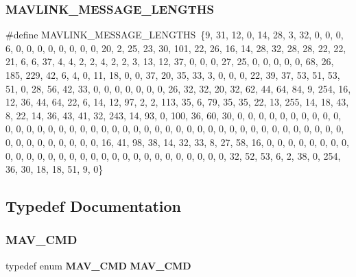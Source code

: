 \mbox{\label{_a_s_l_u_a_v_8h_aa90005429262b658c881fa203c4de208}} 
\subsubsection{M\+A\+V\+L\+I\+N\+K\+\_\+\+M\+E\+S\+S\+A\+G\+E\+\_\+\+L\+E\+N\+G\+T\+HS}
{\footnotesize\ttfamily \#define M\+A\+V\+L\+I\+N\+K\+\_\+\+M\+E\+S\+S\+A\+G\+E\+\_\+\+L\+E\+N\+G\+T\+HS~\{9, 31, 12, 0, 14, 28, 3, 32, 0, 0, 0, 6, 0, 0, 0, 0, 0, 0, 0, 0, 20, 2, 25, 23, 30, 101, 22, 26, 16, 14, 28, 32, 28, 28, 22, 22, 21, 6, 6, 37, 4, 4, 2, 2, 4, 2, 2, 3, 13, 12, 37, 0, 0, 0, 27, 25, 0, 0, 0, 0, 0, 68, 26, 185, 229, 42, 6, 4, 0, 11, 18, 0, 0, 37, 20, 35, 33, 3, 0, 0, 0, 22, 39, 37, 53, 51, 53, 51, 0, 28, 56, 42, 33, 0, 0, 0, 0, 0, 0, 0, 26, 32, 32, 20, 32, 62, 44, 64, 84, 9, 254, 16, 12, 36, 44, 64, 22, 6, 14, 12, 97, 2, 2, 113, 35, 6, 79, 35, 35, 22, 13, 255, 14, 18, 43, 8, 22, 14, 36, 43, 41, 32, 243, 14, 93, 0, 100, 36, 60, 30, 0, 0, 0, 0, 0, 0, 0, 0, 0, 0, 0, 0, 0, 0, 0, 0, 0, 0, 0, 0, 0, 0, 0, 0, 0, 0, 0, 0, 0, 0, 0, 0, 0, 0, 0, 0, 0, 0, 0, 0, 0, 0, 0, 0, 0, 0, 0, 0, 0, 0, 0, 16, 41, 98, 38, 14, 32, 33, 8, 27, 58, 16, 0, 0, 0, 0, 0, 0, 0, 0, 0, 0, 0, 0, 0, 0, 0, 0, 0, 0, 0, 0, 0, 0, 0, 0, 0, 0, 0, 0, 0, 32, 52, 53, 6, 2, 38, 0, 254, 36, 30, 18, 18, 51, 9, 0\}}



\subsection{Typedef Documentation}
\mbox{\label{_a_s_l_u_a_v_8h_a5dc19d5d08917612a87569de76842730}} 
\subsubsection{M\+A\+V\+\_\+\+C\+MD}
{\footnotesize\ttfamily typedef enum \textbf{ M\+A\+V\+\_\+\+C\+MD}  \textbf{ M\+A\+V\+\_\+\+C\+MD}}



